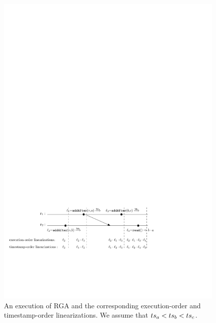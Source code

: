 \begin{figure}[t]
  \centering
  \includegraphics[width=0.7 \textwidth]{figures/RGAHisandLin.pdf}
  \caption{An execution of RGA and the corresponding execution-order and timestamp-order linearizations. We assume that $ts_a<ts_b<ts_c$.}
  \label{fig:a history of RGA and its RA-linearization}
\end{figure}

